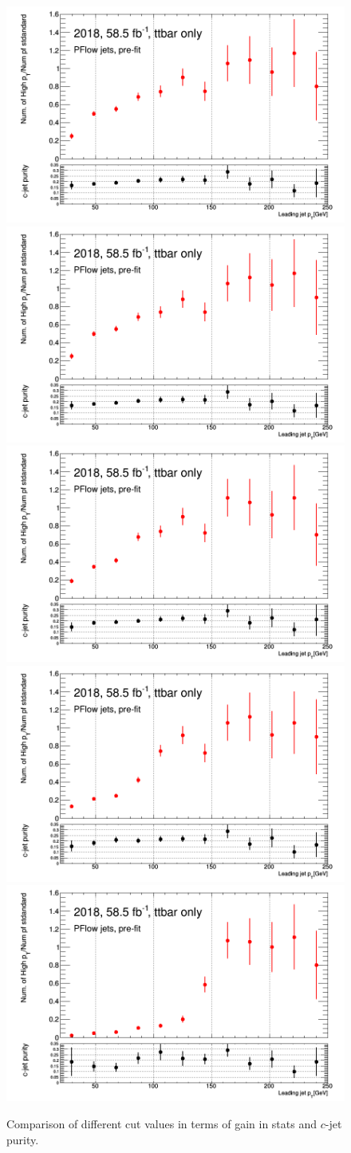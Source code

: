\documentclass[letterpaper,12pt]{article}
\begin{document}
\begin{figure}[!h]
\includegraphics[width=.45\textwidth]{stat_gains/statsgain_0GeV.png}
\includegraphics[width=.45\textwidth]{stat_gains/statsgain_40GeV.png}
\includegraphics[width=.45\textwidth]{stat_gains/statsgain_70GeV.png}
\includegraphics[width=.45\textwidth]{stat_gains/statsgain_90GeV.png}
\centering
\includegraphics[width=.45\textwidth]{stat_gains/statsgain_140GeV.png}

\caption{Comparison of different cut values in terms of gain in stats and $c$-jet purity.}
\label{fig:cutvalue}
\end{figure}
\end{document}
